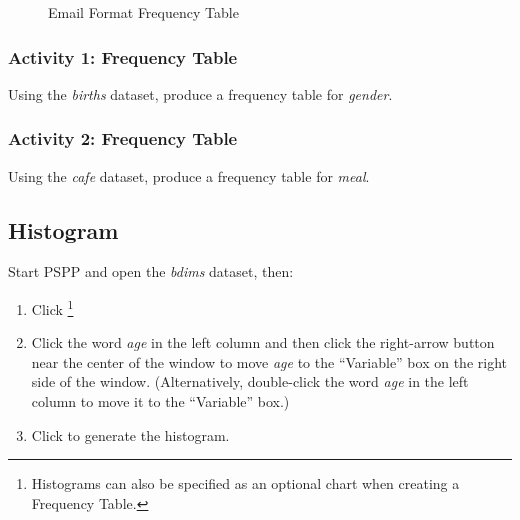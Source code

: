 \begin{figure}[H]
  \begin{center}
    \caption{Email Format Frequency Table}
    \label{lab02_fig04}    
  \end{center}
\end{figure}

\subsubsection{Activity 1: Frequency Table} \label{lab02_act01}

Using the \textit{births} dataset, produce a frequency table for \textit{gender}.

\subsubsection{Activity 2: Frequency Table} \label{lab02_act02}

Using the \textit{cafe} dataset, produce a frequency table for \textit{meal}.

\subsection{Histogram}

Start \acs{PSPP} and open the \textit{bdims} dataset, then:

\begin{enumerate}
  \item Click \textsc{}\footnote{Histograms can also be specified as an optional chart when creating a Frequency Table.}
  \item Click the word \textit{age} in the left column and then click the right-arrow button near the center of the window to move \textit{age} to the ``Variable'' box on the right side of the window. (Alternatively, double-click the word \textit{age} in the left column to move it to the ``Variable'' box.)
  \item Click  to generate the histogram.
\end{enumerate}


